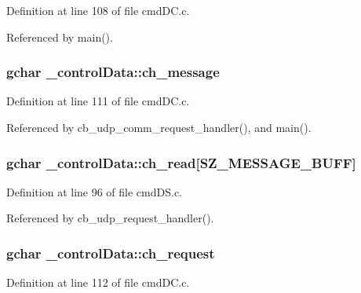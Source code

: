 Definition at line 108 of file cmd\+D\+C.\+c.



Referenced by main().

\hypertarget{struct__control_data_a16162d5fe851704d7ea50ff16525b94c}{
\subsubsection[{ch\+\_\+message}]{\setlength{\rightskip}{0pt plus 5cm}gchar \+\_\+control\+Data\+::ch\+\_\+message}}\label{struct__control_data_a16162d5fe851704d7ea50ff16525b94c}


Definition at line 111 of file cmd\+D\+C.\+c.



Referenced by cb\+\_\+udp\+\_\+comm\+\_\+request\+\_\+handler(), and main().

\hypertarget{struct__control_data_a243b075becb92f2f37f56f60f738efb1}{
\subsubsection[{ch\+\_\+read}]{\setlength{\rightskip}{0pt plus 5cm}gchar \+\_\+control\+Data\+::ch\+\_\+read\mbox{[}{\bf S\+Z\+\_\+\+M\+E\+S\+S\+A\+G\+E\+\_\+\+B\+U\+F\+F}\mbox{]}}}\label{struct__control_data_a243b075becb92f2f37f56f60f738efb1}


Definition at line 96 of file cmd\+D\+S.\+c.



Referenced by cb\+\_\+udp\+\_\+request\+\_\+handler().

\hypertarget{struct__control_data_a948c37bbe26f5bdd4841b65384155edf}{
\subsubsection[{ch\+\_\+request}]{\setlength{\rightskip}{0pt plus 5cm}gchar \+\_\+control\+Data\+::ch\+\_\+request}}\label{struct__control_data_a948c37bbe26f5bdd4841b65384155edf}


Definition at line 112 of file cmd\+D\+C.\+c.



